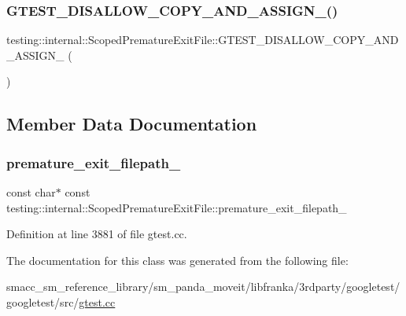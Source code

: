 \subsubsection{\texorpdfstring{G\+T\+E\+S\+T\+\_\+\+D\+I\+S\+A\+L\+L\+O\+W\+\_\+\+C\+O\+P\+Y\+\_\+\+A\+N\+D\+\_\+\+A\+S\+S\+I\+G\+N\+\_\+()}{GTEST\_DISALLOW\_COPY\_AND\_ASSIGN\_()}}
{\footnotesize\ttfamily testing\+::internal\+::\+Scoped\+Premature\+Exit\+File\+::\+G\+T\+E\+S\+T\+\_\+\+D\+I\+S\+A\+L\+L\+O\+W\+\_\+\+C\+O\+P\+Y\+\_\+\+A\+N\+D\+\_\+\+A\+S\+S\+I\+G\+N\+\_\+ (\begin{DoxyParamCaption}\item[{\hyperlink{classtesting_1_1internal_1_1ScopedPrematureExitFile}{Scoped\+Premature\+Exit\+File}}]{ }\end{DoxyParamCaption})\hspace{0.3cm}{\ttfamily [private]}}



\subsection{Member Data Documentation}
\mbox{\label{classtesting_1_1internal_1_1ScopedPrematureExitFile_a41f573a197749afb0a2b14b289f7aa62}} 
\subsubsection{\texorpdfstring{premature\+\_\+exit\+\_\+filepath\+\_\+}{premature\_exit\_filepath\_}}
{\footnotesize\ttfamily const char$\ast$ const testing\+::internal\+::\+Scoped\+Premature\+Exit\+File\+::premature\+\_\+exit\+\_\+filepath\+\_\+\hspace{0.3cm}{\ttfamily [private]}}



Definition at line 3881 of file gtest.\+cc.



The documentation for this class was generated from the following file\+:\begin{DoxyCompactItemize}
\item 
smacc\+\_\+sm\+\_\+reference\+\_\+library/sm\+\_\+panda\+\_\+moveit/libfranka/3rdparty/googletest/googletest/src/\hyperlink{gtest_8cc}{gtest.\+cc}\end{DoxyCompactItemize}
